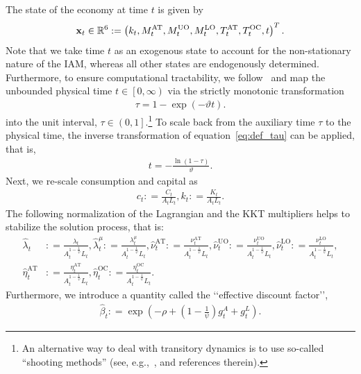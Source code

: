 \documentclass[11pt, a4paper, pdftex, twoside, dvipsnames]{article}
\newcommand{\defeq}{\mathrel{\mathop:}=}
\begin{document}
\begin{appendices}
The state of the economy at time $t$ is given by 
%
\begin{equation}
    {\bf{x}}_t \in \mathbb{R}^6 := \left(k_t, M^{\text{AT}}_{t}, M^{\text{UO}}_{t}, M^{\text{LO}}_{t}, T^{\text{AT}}_{t}, T^{\text{OC}}_{t}, t \right)^T.
\end{equation}
%
Note that we take time $t$ as an exogenous state to account for the non-stationary nature of the IAM, whereas all other states are endogenously determined. Furthermore, to ensure computational tractability, we follow~\citet{Traeger2014} and map the unbounded physical time $t \in \left[0,\infty\right)$ via the strictly monotonic transformation
%
\begin{align}
  \label{eq:def_tau}
  \tau = 1 - \exp\left(-\vartheta t\right).
\end{align}
%
into the unit interval, $\tau \in \left(0, 1\right]$.\footnote{An alternative way to deal with transitory dynamics is to use so-called ``shooting methods'' (see, e.g.,~\cite{arellano_2023}, and references therein).} To scale back from the auxiliary time $\tau$ to the physical time, the inverse transformation of equation~\eqref{eq:def_tau} can be applied, that is, 
%
\begin{align}
  \label{eq:inverse_tau}
  t = -\frac{\ln\left(1-\tau\right)}{\vartheta}.
\end{align}
%
Next, we re-scale consumption and capital as
%
\begin{align}
  \label{eq:labor_argument}
  c_{t} \defeq \frac{C_{t}}{A_{t}L_{t}}, k_{t} \defeq \frac{K_{t}}{A_{t}L_{t}}.
\end{align}
The following normalization of 
the Lagrangian and the KKT multipliers helps to stabilize the solution process, that is:
%
\begin{align}
 \nonumber
  \hat{\lambda}_{t} &\defeq
  \frac{\lambda_{t}}{A_{t}^{1-\frac{1}{\psi}}L_{t}},
  \hat{\lambda}^{\mu}_{t} \defeq
  \frac{\lambda^{\mu}_{t}}{A_{t}^{1-\frac{1}{\psi}}L_{t}},
  \hat{\nu}^{\text{AT}}_{t} \defeq
  \frac{\nu^{\text{AT}}_{t}}{A_{t}^{1-\frac{1}{\psi}}L_{t}},
  \hat{\nu}^{\text{UO}}_{t} \defeq
  \frac{\nu^{\text{UO}}_{t}}{A_{t}^{1-\frac{1}{\psi}}L_{t}},
  \hat{\nu}^{\text{LO}}_{t} \defeq
  \frac{\nu^{\text{LO}}_{t}}{A_{t}^{1-\frac{1}{\psi}}L_{t}},\\ \label{eq:multiplier_ALunit}
  \hat{\eta}^{\text{AT}}_{t} &\defeq
  \frac{\eta^{\text{AT}}_{t}}{A_{t}^{1-\frac{1}{\psi}}L_{t}},
  \hat{\eta}^{\text{OC}}_{t} \defeq
  \frac{\eta^{\text{OC}}_{t}}{A_{t}^{1-\frac{1}{\psi}}L_{t}}.
\end{align}
%
Furthermore, we introduce a quantity called the \lq\lq effective discount factor\rq\rq, 
\begin{align}
  \label{eq:effective_beta}
  \hat{\beta}_t \defeq
  \exp\left(-\rho + \left(1-\frac{1}{\psi}\right)g^{A}_{t} + g^{L}_{t}\right).
\end{align}
%



\end{appendices}
\end{document}
